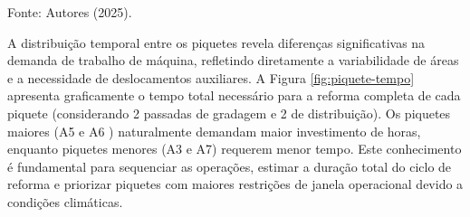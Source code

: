 \documentclass[12pt,openright,oneside,a4paper,hidelinks,espacamento=1.5]{abntex2}
\begin{document}
\begin{table}[H]
    \centering
    \caption{Estimativa de tempo real de trabalho por piquete (por passada).}
    \label{tab:tempos_piquete}
    \vspace{0.1cm}
    \begin{flushleft}\begin{footnotesize}
        Fonte: Autores (2025).
    \end{footnotesize}\end{flushleft}
\end{table}

A distribuição temporal entre os piquetes revela diferenças significativas na demanda de trabalho de máquina, refletindo diretamente a variabilidade de áreas e a necessidade de deslocamentos auxiliares. A Figura \ref{fig:piquete-tempo} apresenta graficamente o tempo total necessário para a reforma completa de cada piquete (considerando 2 passadas de gradagem e 2 de distribuição). Os piquetes maiores (A5 e A6 ) naturalmente demandam maior investimento de horas, enquanto piquetes menores (A3 e A7) requerem menor tempo. Este conhecimento é fundamental para sequenciar as operações, estimar a duração total do ciclo de reforma e priorizar piquetes com maiores restrições de janela operacional devido a condições climáticas.
\end{document}
